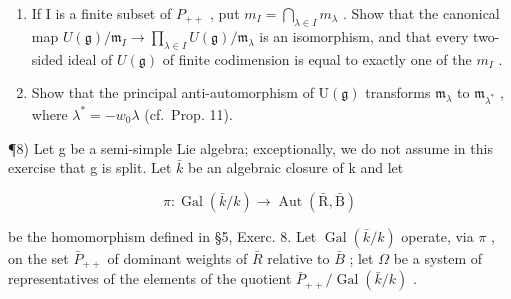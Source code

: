 \begin{enumerate}
\def\labelenumi{\alph{enumi})}
\setcounter{enumi}{1}
\item
  If I is a finite subset of \(P_{++}\) , put \(m_{I} = \bigcap_{\lambda \in I} m_{\lambda}\) . Show that the canonical map \(U(\mathfrak{g}) / \mathfrak{m}_{I} \to \prod_{\lambda \in I} U(\mathfrak{g}) / \mathfrak{m}_{\lambda}\) is an isomorphism, and that every two-sided ideal of \(U(\mathfrak{g})\) of finite codimension is equal to exactly one of the \(m_{I}\) .
\item
  Show that the principal anti-automorphism of \(\mathrm{U}(\mathfrak{g})\) transforms \(\mathfrak{m}_{\lambda}\) to \(\mathfrak{m}_{\lambda^*}\) , where \(\lambda^{*} = -w_{0}\lambda\) (cf.~Prop. 11).
\end{enumerate}

¶8) Let g be a semi-simple Lie algebra; exceptionally, we do not assume in this exercise that g is split. Let \(\bar{k}\) be an algebraic closure of k and let

\[
\pi : \operatorname{Gal} (\bar {k} / k) \to \operatorname{Aut} (\bar {\mathrm{R}}, \bar {\mathrm{B}})
\]

be the homomorphism defined in §5, Exerc. 8. Let \(\operatorname{Gal}(\bar{k}/k)\) operate, via \(\pi\) , on the set \(\bar{P}_{++}\) of dominant weights of \(\bar{R}\) relative to \(\bar{B}\) ; let \(\Omega\) be a system of representatives of the elements of the quotient \(\bar{P}_{++}/\operatorname{Gal}(\bar{k}/k)\) .

